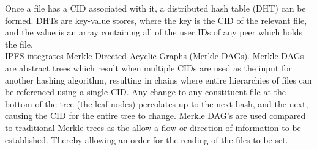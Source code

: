 Once a file has a CID associated with it, a distributed hash table (DHT) can be formed. DHTs are key-value stores, where the key is the CID of the relevant file, and the value is an array containing all of the user IDs of any peer which holds the file. \\

IPFS integrates Merkle Directed Acyclic Graphs (Merkle DAGs). Merkle DAGs are abstract trees which result when multiple CIDs are used as the input for another hashing algorithm, resulting in chains where entire hierarchies of files can be referenced using a single CID. Any change to any constituent file at the bottom of the tree (the leaf nodes) percolates up to the next hash, and the next, causing the CID for the entire tree to change. Merkle DAG's are used compared to traditional Merkle trees as the allow a flow or direction of information to be established. Thereby allowing an order for the reading of the files to be set. 
